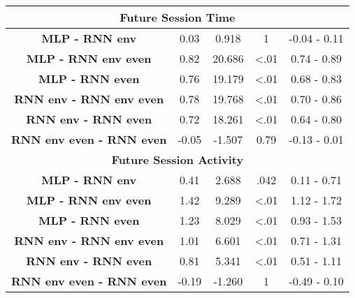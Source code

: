 \begin{table}[h]
\begin{tabular}{ccccc}
\multicolumn{5}{c}{\textbf{Future Session Time}}                                                                     \\ \hline
\textbf{MLP - RNN env} & 0.03                & 0.918     & 1   & -0.04 - 0.11                    \\
\textbf{MLP - RNN env even}           & 0.82                & 20.686     & \textless .01   & 0.74 - 0.89                     \\
\textbf{MLP - RNN even}           & 0.76                & 19.179     & \textless .01   & 0.68 - 0.83                     \\
\textbf{RNN env - RNN env even}           & 0.78                & 19.768     & \textless .01   & 0.70 - 0.86                    \\
\textbf{RNN env - RNN even}           & 0.72                & 18.261     & \textless .01   & 0.64 - 0.80                     \\
\textbf{RNN env even - RNN even}          & -0.05                & -1.507     & 0.79   & -0.13 - 0.01                    \\ \hline

\multicolumn{5}{c}{\textbf{Future Session Activity}}                                                                 \\ \hline
\textbf{MLP - RNN env} & 0.41                & 2.688     &  .042   & 0.11 - 0.71                     \\
\textbf{MLP - RNN env even}           & 1.42                & 9.289     & \textless .01   & 1.12 - 1.72                     \\
\textbf{MLP - RNN even}           & 1.23                & 8.029     & \textless .01   & 0.93 - 1.53                     \\
\textbf{RNN env - RNN env even}           & 1.01                & 6.601     & \textless .01   & 0.71 - 1.31                     \\
\textbf{RNN env - RNN even}           & 0.81               & 5.341     & \textless .01   & 0.51 - 1.11                     \\
\textbf{RNN env even - RNN even}          & -0.19                & -1.260     &  1   & -0.49 - 0.10                    \\ \hline


\end{tabular}
\end{table}
